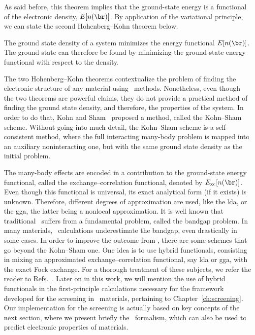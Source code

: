 As said before, this theorem implies that the ground-state energy is a functional of the electronic density, $E[n(\br)]$.
By application of the variational principle, we can state the second Hohenberg--Kohn theorem below.

\begin{theorem-non}
    \label{th:HK_theorem_II}
    The ground state density of a system minimizes the energy functional $E[n(\br)]$.
    The ground state can therefore be found by minimizing the ground-state energy functional with respect to the density.
\end{theorem-non}

The two Hohenberg--Kohn theorems contextualize the problem of finding the electronic structure of any material using \abinit~methods.
Nonetheless, even though the two theorems are powerful claims, they do not provide a practical method of finding the ground state density, and therefore, the properties of the system.
In order to do that, Kohn and Sham~\cite{Kohn_Sham_1965} proposed a method, called the Kohn--Sham scheme.
Without going into much detail, the Kohn--Sham scheme is a self-consistent method, where the full interacting many-body problem is mapped into an auxiliary noninteracting one, but with the same ground state density as the initial problem.

The many-body effects are encoded in a contribution to the ground-state energy functional, called the exchange--correlation functional, denoted by $E_{\mathrm{xc}}[n(\br)]$.
Even though this functional is universal, its exact analytical form (if it exists) is unknown.
Therefore, different degrees of approximation are used, like the \gls{lda}, or the \gls{gga}, the latter being a nonlocal approximation.
It is well known that traditional \dft~suffers from a fundamental problem, called the bandgap problem.
In many materials, \dft~calculations underestimate the bandgap, even drastically in some cases.
In order to improve the outcome from \dft, there are some schemes that go beyond the Kohn--Sham one.
One idea is to use hybrid functionals, consisting in mixing an approximated exchange--correlation functional, say \gls{lda} or \gls{gga}, with the exact Fock exchange.
For a thorough treatment of these subjects, we refer the reader to Refs.~\cite{Martin_2004,Kohanoff_2006}.
Later on in this work, we will mention the use of hybrid functionals in the first-principle calculations necessary for the framework developed for the screening in \bd~materials, pertaining to Chapter~\ref{ch:screening}.
Our implementation for the screening is actually based on key concepts of the next section, where we present briefly the \mbpt~formalism, which can also be used to predict electronic properties of materials.

